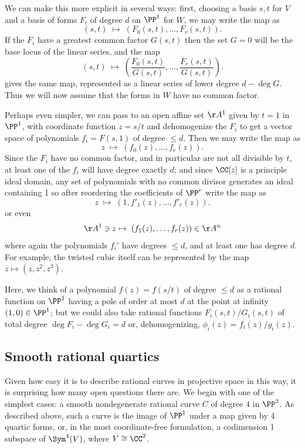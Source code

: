 We can make this more explicit in several ways: first, choosing a basis $s,t$ for $V$ and a basis of forms $F_i$ of degree $d$ on $\PP^1$ for $W$, we may write the map as
$$
(s,t) \; \mapsto \; (F_0(s,t), \dots, F_r(s,t)).
$$
If the $F_i$ have a greatest common factor $G(s,t)$ then the set $G=0$ will be the base locus
of the linear series, and the map
$$
(s,t) \; \mapsto \; ( \frac{F_0(s,t)}{G(s,t)}, \dots, \frac{F_r(s,t)}{G(s,t)}).
$$
gives the same map, represented as a linear series of lower degree $d-\deg G$. Thus we
will now assume that the forms in $W$ have no common factor.

Perhaps even simpler, we can pass to an open affine set $\AA^1$ given by $t=1$ in $\PP^1$, with coordinate function $z = s/t$ and
dehomogenize the $F_i$ to get a vector space of polynomials $f_i = F(s,1)$ of degree $\leq d$. Then we may write the
map as
$$
z \; \mapsto \; (f_0(z), \dots, f_r(z)).
$$
Since the $F_i$ have no common factor, and in particular are not all divisible by $t$, at least one of the
$f_i$ will have degree exactly $d$; and since $\CC[z]$ is a principle ideal domain, any set of 
polynomials with no common divisor generates an ideal containing 
1 so after reordering the coefficients of $\PP^r$ write the map as
$$
z \; \mapsto \; (1, f'_1(z), \dots, f'_r(z)).
$$
or even
$$
\AA^1 \ni z \mapsto \; (f_1(z), \dots, f_r(z))\in \AA^n
$$
where again the polynomials $f_i'$ have degrees $\leq d$, and at least one has degree $d$.
For example, the twisted cubic itself can be represented by the map
$z \mapsto (z,z^2,z^3)$.

Here, we think of a polynomial $f(z) = f(s/t)$ of degree $\leq d$ as a rational function on $\PP^1$ having
a pole of order at most $d$ at the point at infinity $(1,0)\in \PP^1$; but we could also take rational
functions $F_i(s,t)/G_i(s,t)$ of total degree $\deg F_i-\deg G_i = d$ or, dehomogenizing, $\phi_i(z) = f_i(z)/g_i(z)$.

\subsection *{Smooth rational quartics}
Given how easy it is to describe rational curves in projective space in this way, it is surprising how many open questions there are. We begin with
one of the simplest cases: a smooth nondegenerate rational curve $C$ of degree $4$ in $\PP^3$.
As described above, such a curve is the image of $\PP^1$ under a map given by 4 quartic forms,
or, in the most coordinate-free formulation, a codimension 1 subspace of $\Sym^4(V)$, where
$V\cong \CC^2$. 

